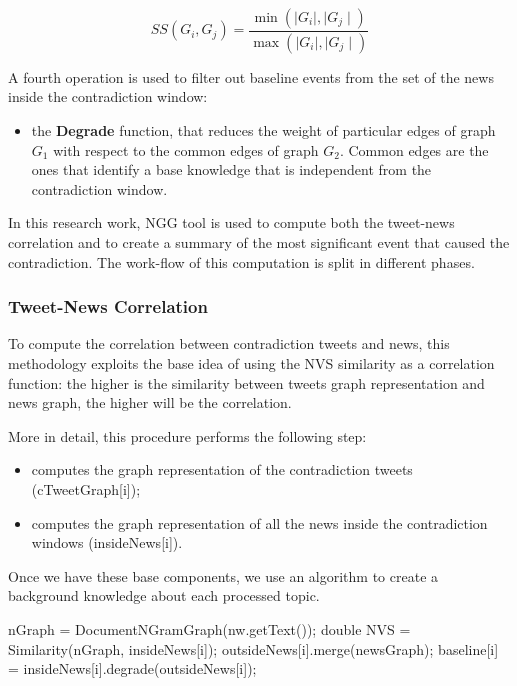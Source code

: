 \begin{equation}
 SS(G_i,G_j)=\frac{\min(\mid G_i \mid, \mid G_j \mid)}{\max(\mid G_i \mid, \mid G_j \mid)}
\end{equation}

A fourth operation is used to filter out baseline events from the set of the news inside the contradiction window:
\begin{itemize}
 	\item the \textbf{Degrade} function, that reduces the weight of particular edges of graph $G_1$ with respect to the common edges of graph $G_2$. Common edges are the ones that identify a base knowledge that is independent from the contradiction window.
\end{itemize}

In this research work, NGG tool is used to compute both the tweet-news correlation and to create a summary of the most significant event that caused the contradiction. 
The work-flow of this computation is split in different phases.

\subsubsection*{Tweet-News Correlation}
To compute the correlation between contradiction tweets and news, this methodology exploits the base idea of using the NVS similarity as a correlation function: the higher is the similarity between tweets graph representation and news graph, the higher will be the correlation.

More in detail, this procedure performs the following step:
\begin{itemize}
	\item computes the graph representation of the contradiction tweets (cTweetGraph[i]);
	\item computes the  graph representation of all the news inside the contradiction windows (insideNews[i]).
\end{itemize}

Once we have these base components, we use an algorithm to create a background knowledge about each processed topic.

\begin{algorithmic}
		\STATE nGraph = DocumentNGramGraph(nw.getText());
		\STATE double NVS = Similarity(nGraph, insideNews[i]);
			\STATE outsideNews[i].merge(newsGraph);
		\ENDIF
	\ENDIF
\ENDFOR
\STATE baseline[i] = insideNews[i].degrade(outsideNews[i]);
\end{algorithmic}

